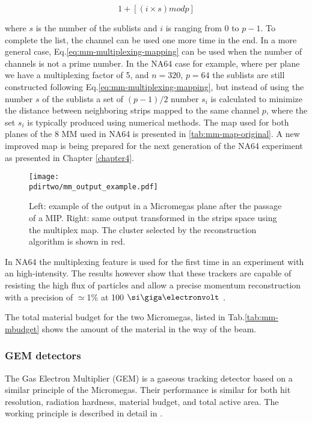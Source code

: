 \begin{equation}
\label{eq:mm-multiplexing-mapping}
1 + [(i \times s) mod p]
\end{equation}

where $s$ is the number of the sublists and $i$ is ranging from 0 to $p-1$. To complete the list, the channel can be used one more time in the end. In a more general case, Eq.\ref{eq:mm-multiplexing-mapping} can be used when the number of channels is not a prime number. In the NA64 case for example, where per plane we have a multiplexing factor of 5, and $n=320$, $p=64$ the sublists are still constructed following Eq.\ref{eq:mm-multiplexing-mapping}, but instead of using the number $s$ of the sublists a set of $(p-1)/2$ number $s_i$ is calculated to minimize the distance between neighboring strips mapped to the same channel $p$, where the set $s_i$ is typically produced using numerical methods. The map used for both planes of the 8 MM used in NA64 is presented in \ref{tab:mm-map-original}. A new improved map is being prepared for the next generation of the NA64 experiment as presented in Chapter \ref{chapter4}.

\begin{figure}[bth!]
  \centering
  \texttt{[image: \\pdirtwo/mm\_output\_example.pdf]}
\caption[example of the readout of a multiplexing detector]{Left: example of the output in a Micromegas plane after the passage of a MIP. Right: same output transformed in the strips space using the multiplex map. The cluster selected by the reconstruction algorithm is shown in red.}
\label{fig:multiplexing-example}
\end{figure}

In NA64 the multiplexing feature is used for the first time in an experiment with an high-intensity. The results however show that these trackers are capable of resisting the high flux of particles and allow a precise momentum reconstruction with a precision of $\simeq$1\% at 100 $\gev$ \cite{Banerjee:2017mdu}.

The total material budget for the two Micromegas, listed in Tab.\ref{tab:mm-mbudget} shows the amount of the material in the way of the beam.

\subsubsection{GEM detectors}
\label{ch2:sec:gem}
The Gas Electron Multiplier (GEM) is a gaseous tracking detector based on a similar principle of the Micromegas. Their performance is similar for both hit resolution, radiation hardness, material budget, and total active area. The working principle is described in detail in \cite{gem,SAULI20162,ABBON2007455}.

